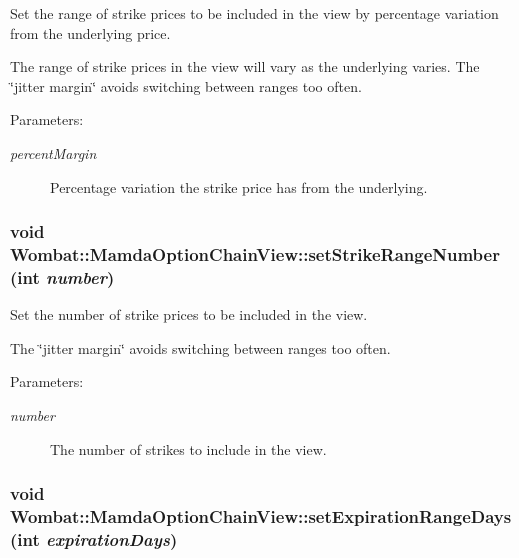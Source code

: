 Set the range of strike prices to be included in the view by percentage variation from the underlying price. 

The range of strike prices in the view will vary as the underlying varies. The \char`\"{}jitter margin\char`\"{} avoids switching between ranges too often.

\begin{Desc}
\item[Parameters:]
\begin{description}
\item[{\em percent\-Margin}]Percentage variation the strike price has from the underlying. \end{description}
\end{Desc}
\hypertarget{classWombat_1_1MamdaOptionChainView_3c81aaafb26be5be4817009bc766b688}{
\subsubsection[setStrikeRangeNumber]{\setlength{\rightskip}{0pt plus 5cm}void Wombat::Mamda\-Option\-Chain\-View::set\-Strike\-Range\-Number (int {\em number})}}
\label{classWombat_1_1MamdaOptionChainView_3c81aaafb26be5be4817009bc766b688}


Set the number of strike prices to be included in the view. 

The \char`\"{}jitter margin\char`\"{} avoids switching between ranges too often.

\begin{Desc}
\item[Parameters:]
\begin{description}
\item[{\em number}]The number of strikes to include in the view. \end{description}
\end{Desc}
\hypertarget{classWombat_1_1MamdaOptionChainView_2d8ab089e9fb64bed9a8a3be612ac618}{
\subsubsection[setExpirationRangeDays]{\setlength{\rightskip}{0pt plus 5cm}void Wombat::Mamda\-Option\-Chain\-View::set\-Expiration\-Range\-Days (int {\em expiration\-Days})}}
\label{classWombat_1_1MamdaOptionChainView_2d8ab089e9fb64bed9a8a3be612ac618}


